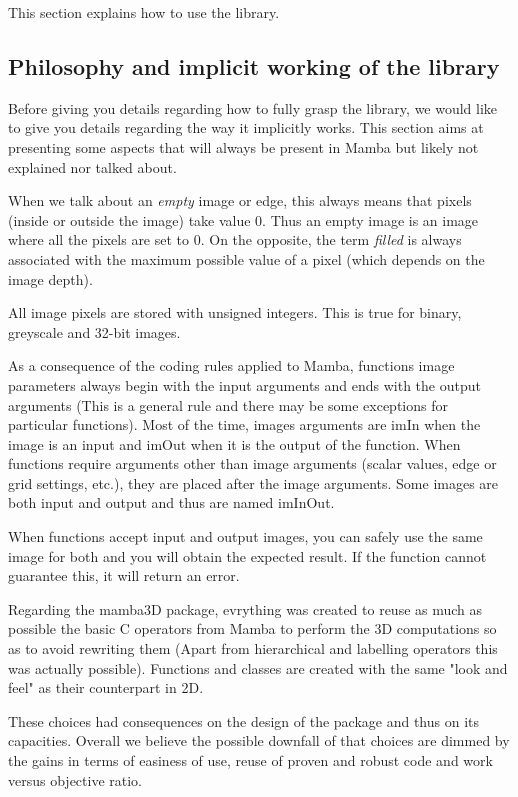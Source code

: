 \documentclass[a4paper,10pt,oneside]{article}
\begin{document}
This section explains how to use the library.

\subsection{Philosophy and implicit working of the library}

Before giving you details regarding how to fully grasp the library, we would
like to give you details regarding the way it implicitly works. This section aims
at presenting some aspects that will always be present in Mamba but likely not 
explained nor talked about.

When we talk about an \textit{empty} image or edge, this always means that pixels 
(inside or outside the image) take value 0. Thus an empty
image is an image where all the pixels are set to 0. On the opposite, the term 
\textit{filled} is always associated with the maximum possible value of a pixel (which
depends on the image depth).

All image pixels are stored with unsigned integers. This is true for binary,
greyscale and 32-bit images.

As a consequence of the coding rules applied to Mamba, functions image parameters
always begin with the input arguments and ends with the output arguments (This 
is a general rule and there may be some exceptions for particular functions).
Most of the time, images arguments are imIn when the image is an input and imOut
when it is the output of the function. When functions require arguments other than 
image arguments (scalar values, edge or grid settings, etc.), they are placed after 
the image arguments. Some images are both input and output and thus are named
imInOut.

When functions accept input and output images, you can safely use the same image
for both and you will obtain the expected result. If the function cannot 
guarantee this, it will return an error.

Regarding the mamba3D package, evrything was created to reuse as much as
possible the basic C operators from Mamba to perform the 3D computations so
as to avoid rewriting them (Apart from hierarchical and labelling operators
this was actually possible). Functions and classes are created with the same
"look and feel" as their counterpart in 2D.

These choices had consequences on the design of the package and thus on its
capacities. Overall we believe the possible downfall of that choices are
dimmed by the gains in terms of easiness of use, reuse of proven and robust
code and work versus objective ratio.
\end{document}
